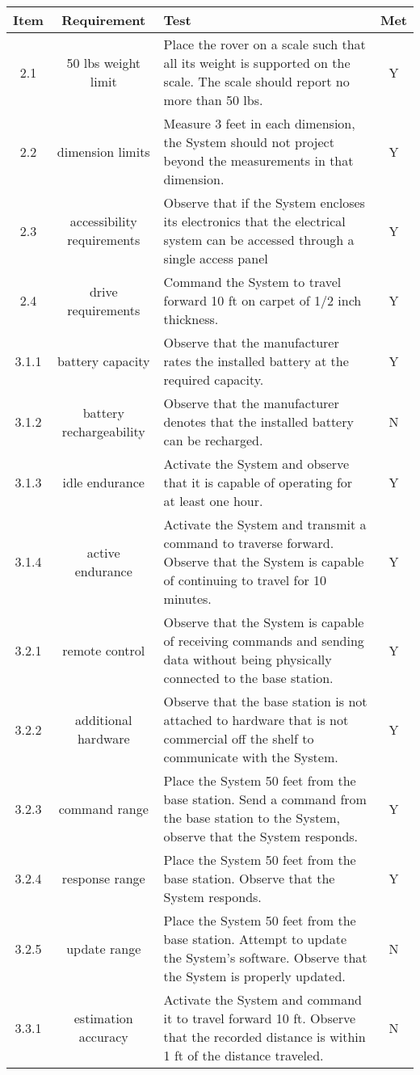 \documentclass{article}
\begin{document}
\begin{tabular}{|c|c|p{8cm}|c|}
  \hline
  Item & Requirement & Test & Met\\\hline
  2.1 & 50 lbs weight limit & Place the rover on a scale such that all its weight is supported on the scale.  The scale should report no more than 50 lbs. & Y \\\hline
  2.2 & dimension limits & Measure 3 feet in each dimension, the System should not project beyond the measurements in that dimension. & Y \\\hline
  2.3 & accessibility requirements & Observe that if the System encloses its electronics that the electrical system can be accessed through a single access panel & Y \\\hline
  2.4 & drive requirements & Command the System to travel forward 10 ft on carpet of 1/2 inch thickness. & Y \\\hline
  3.1.1 & battery capacity & Observe that the manufacturer rates the installed battery at the required capacity. & Y \\\hline
  3.1.2 & battery rechargeability & Observe that the manufacturer denotes that the installed battery can be recharged. & N \\\hline
  3.1.3 & idle endurance & Activate the System and observe that it is capable of operating for at least one hour. & Y \\\hline
  3.1.4 & active endurance & Activate the System and transmit a command to traverse forward.  Observe that the System is capable of continuing to travel for 10 minutes. & Y \\\hline
  3.2.1 & remote control & Observe that the System is capable of receiving commands and sending data without being physically connected to the base station. & Y \\\hline
  3.2.2 & additional hardware & Observe that the base station is not attached to hardware that is not commercial off the shelf to communicate with the System. & Y \\\hline
  3.2.3 & command range & Place the System 50 feet from the base station. Send a command from the base station to the System, observe that the System responds. & Y \\\hline
  3.2.4 & response range & Place the System 50 feet from the base station. Observe that the System responds. & Y \\\hline
  3.2.5 & update range & Place the System 50 feet from the base station. Attempt to update the System's software.  Observe that the System is properly updated. & N \\\hline
  3.3.1 & estimation accuracy & Activate the System and command it to travel forward 10 ft.  Observe that the recorded distance is within 1 ft of the distance traveled. & N \\\hline

\end{tabular}
\end{document}
